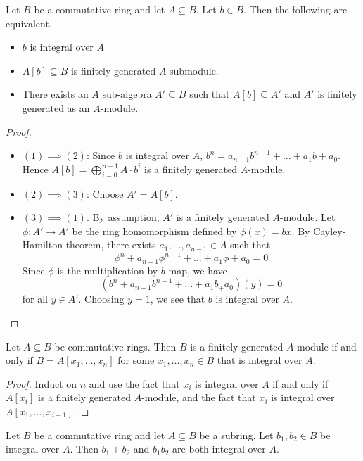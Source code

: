 \documentclass[a4paper]{article}
\begin{document}
\begin{prp}{}{} Let $B$ be a commutative ring and let $A\subseteq B$. Let $b\in B$. Then the following are equivalent. 
\begin{itemize}
\item $b$ is integral over $A$
\item $A[b]\subseteq B$ is finitely generated $A$-submodule. 
\item There exists an $A$ sub-algebra $A'\subseteq B$ such that $A[b]\subseteq A'$ and $A'$ is finitely generated as an $A$-module. 
\end{itemize} 
\begin{proof}~\\
\begin{itemize}
\item $(1)\implies(2)$: Since $b$ is integral over $A$, $b^n=a_{n-1}b^{n-1}+\dots+a_1b+a_0$. Hence $A[b]=\bigoplus_{i=0}^{n-1}A\cdot b^i$ is a finitely generated $A$-module. 
\item $(2)\implies(3)$: Choose $A'=A[b]$. 
\item $(3)\implies(1)$. By assumption, $A'$ is a finitely generated $A$-module. Let $\phi:A'\to A'$ be the ring homomorphism defined by $\phi(x)=bx$. By Cayley-Hamilton theorem, there exists $a_1,\dots,a_{n-1}\in A$ such that $$\phi^n+a_{n-1}\phi^{n-1}+\dots+a_1\phi+a_0=0$$ Since $\phi$ is the multiplication by $b$ map, we have $$(b^n+a_{n-1}b^{n-1}+\dots+a_1b_+a_0)(y)=0$$ for all $y\in A'$. Choosing $y=1$, we see that $b$ is integral over $A$. 
\end{itemize}
\end{proof}
\end{prp}

\begin{lmm}{}{} Let $A\subseteq B$ be commutative rings. Then $B$ is a finitely generated $A$-module if and only if $B=A[x_1,\dots,x_n]$ for some $x_1,\dots,x_n\in B$ that is integral over $A$. 
\begin{proof}
Induct on $n$ and use the fact that $x_i$ is integral over $A$ if and only if $A[x_i]$ is a finitely generated $A$-module, and the fact that $x_i$ is integral over $A[x_1,\dots,x_{i-1}]$. 
\end{proof}
\end{lmm}

\begin{prp}{}{} Let $B$ be a commutative ring and let $A\subseteq B$ be a subring. Let $b_1,b_2\in B$ be integral over $A$. Then $b_1+b_2$ and $b_1b_2$ are both integral over $A$. 
\end{prp}
\end{document}
